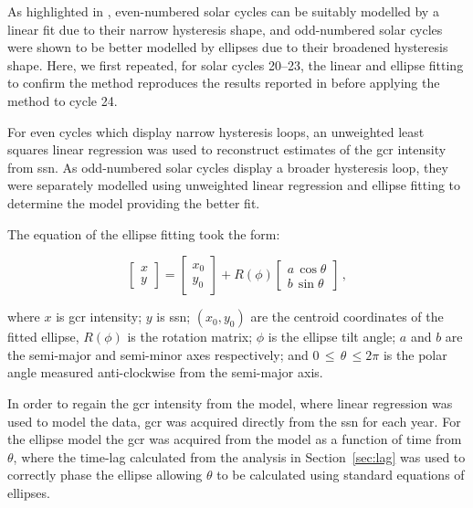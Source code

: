 As highlighted in \citet{inceoglu_modeling_2014}, even-numbered solar cycles can be suitably modelled by a linear fit due to their narrow hysteresis shape, and odd-numbered solar cycles were shown to be better modelled by ellipses due to their broadened hysteresis shape. Here, we first repeated, for solar cycles 20--23, the linear and ellipse fitting to confirm the method reproduces the results reported in \citet{inceoglu_modeling_2014} before applying the method to cycle 24.

For even cycles which display narrow hysteresis loops, an unweighted least squares linear regression was used to reconstruct estimates of the \gls{gcr} intensity from \gls{ssn}. As odd-numbered solar cycles display a broader hysteresis loop, they were separately modelled using unweighted linear regression and ellipse fitting to determine the model providing the better fit. 

The equation of the ellipse fitting took the form:

\begin{equation}
\left[ \begin{array}{c} x \\ y \end{array} 	\right] = 
\left[ \begin{array}{c} x_0 \\ y_0 \end{array} \right] + 
R(\phi)
\left[ \begin{array}{c} a \, \cos{\theta} \\ b \, \sin{\theta} \end{array} \right] \, ,
\label{eq:ellipse}
\end{equation}

where $x$ is \gls{gcr} intensity; $y$ is \gls{ssn}; $(x_0, y_0)$ are the centroid coordinates of the fitted ellipse, $R(\phi)$ is the rotation matrix; $\phi$ is the ellipse tilt angle; $a$ and $b$ are the semi-major and semi-minor axes respectively; and $0 \, \leq \, \theta \, \leq 2\pi$ is the polar angle measured anti-clockwise from the semi-major axis.

In order to regain the \gls{gcr} intensity from the model, where linear regression was used to model the data, \gls{gcr} was acquired directly from the \gls{ssn} for each year. For the ellipse model the \gls{gcr} was acquired from the model as a function of time from $\theta$, where the time-lag calculated from the analysis in Section~\ref{sec:lag} was used to correctly phase the ellipse allowing $\theta$ to be calculated using standard equations of ellipses.

